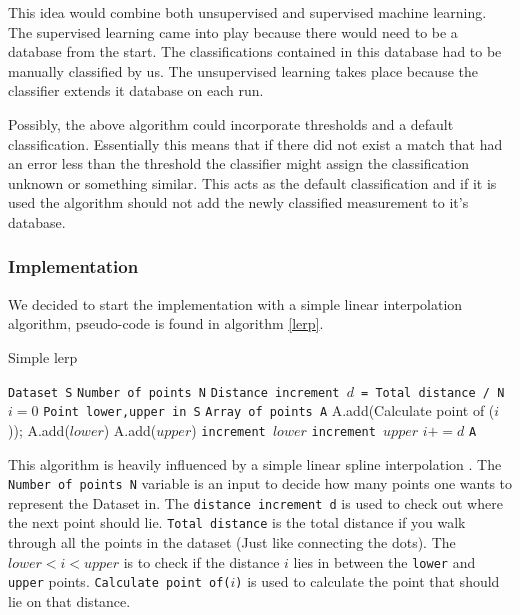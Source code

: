 \documentclass[a4paper, 10pt, conference]{ieeeconf}      %
\begin{document}
This idea would combine both unsupervised and supervised machine learning. The supervised learning came into play because there would need to be a database from the start. The classifications contained in this database had to be manually classified by us. The unsupervised learning takes place because the classifier extends it database on each run.

Possibly, the above algorithm could incorporate thresholds and a default classification. Essentially this means that if there did not exist a match that had an error less than the threshold the classifier might assign the classification unknown or something similar. This acts as the default classification and if it is used the algorithm should not add the newly classified measurement to it's database.

\subsubsection{Implementation}
We decided to start the implementation with a simple linear interpolation algorithm, pseudo-code is found in algorithm \ref{lerp}.

\begin{algorithm}
  \caption{\label{lerp}Simple lerp}
  \begin{algorithmic}[1]
      \State \texttt{Dataset S}
      \State \texttt{Number of points N}
      \State \texttt{Distance increment $d$ = Total distance / N}
      \State \texttt{$i = 0$}
      \State \texttt{Point lower,upper in S}
      \State \texttt{Array of points A}
      		\State A.add(Calculate point of ($i$));
      		\State A.add($lower$)
      		\State A.add($upper$)
      	\Else
      			\State \texttt{increment $lower$}
      			\State \texttt{increment $upper$}
      		\EndWhile
      	\EndIf
      	\State \texttt{$i += d$}
      \EndWhile
      \Return \texttt{A}
  \end{algorithmic}
\end{algorithm}

This algorithm is heavily influenced by a simple linear spline interpolation \cite{interpolation}. The \texttt{Number of points N} variable is an input to decide how many points one wants to represent the Dataset in. The \texttt{distance increment d} is used to check out where the next point should lie. \texttt{Total distance} is the total distance if you walk through all the points in the dataset (Just like connecting the dots). The \texttt{$lower < i < upper$} is to check if the distance $i$ lies in between the \texttt{lower} and \texttt{upper} points. \texttt{Calculate point of($i$)} is used to calculate the point that should lie on that distance.
\end{document}
